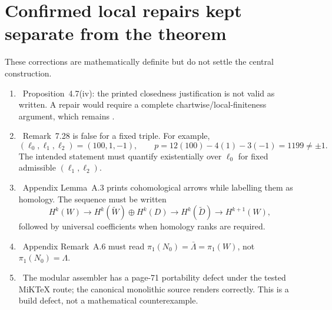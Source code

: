 \section{Confirmed local repairs kept separate from the theorem}

These corrections are mathematically definite but do not settle the central construction.

\begin{enumerate}[leftmargin=2em]
\item \Refuted\ Proposition~4.7(iv): the printed closedness justification is not valid as written.  A repair would require a complete chartwise/local-finiteness argument, which remains \Open.
\item \Refuted\ Remark~7.28 is false for a fixed triple. For example,
\[
(\ell_0,\ell_1,\ell_2)=(100,1,-1),\qquad
p=12(100)-4(1)-3(-1)=1199\ne\pm1.
\]
The intended statement must quantify existentially over $\ell_0$ for fixed admissible $(\ell_1,\ell_2)$.
\item \Verified\ Appendix Lemma~A.3 prints cohomological arrows while labelling them as homology. The sequence must be written
\[
H^k(W)\longrightarrow H^k(\widetilde W)\oplus H^k(D)
\longrightarrow H^k(\widetilde D)\longrightarrow H^{k+1}(W),
\]
followed by universal coefficients when homology ranks are required.
\item \Verified\ Appendix Remark~A.6 must read $\pi_1(N_0)=\bar\Lambda=\pi_1(W)$, not $\pi_1(N_0)=\Lambda$.
\item \Verified\ The modular assembler has a page-71 portability defect under the tested MiK\TeX{} route; the canonical monolithic source renders correctly. This is a build defect, not a mathematical counterexample.
\end{enumerate}

